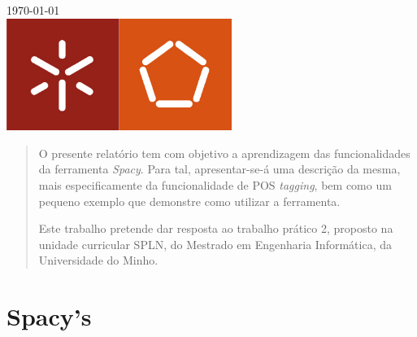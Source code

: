 \documentclass[12pt]{article}
\begin{document}
\begin{titlepage}
{\large \today}\\[1.5cm] %


\includegraphics[width=0.55\textwidth]{logo}\\[1cm] %
 

\vfill %

\end{titlepage}

\vspace{0.5cm}

\begin{abstract}
O presente relatório tem com objetivo a aprendizagem das funcionalidades da ferramenta \textit{Spacy}. Para tal, apresentar-se-á uma descrição da mesma, mais especificamente da funcionalidade de POS \textit{tagging}, bem como um pequeno exemplo que demonstre como utilizar a ferramenta.

Este trabalho pretende dar resposta ao trabalho prático 2, proposto na unidade curricular SPLN, do Mestrado em Engenharia Informática, da Universidade do Minho.
\end{abstract}

\vspace{0.5cm}

\tableofcontents

\newpage

\let\oldref\ref
\renewcommand{\ref}[1]{\smash{\underline{\oldref{#1}}}}

\section{Spacy's}
\end{document}
